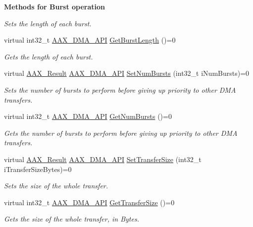 \begin{Indent}{\bf Methods for Burst operation}
\begin{DoxyCompactItemize}
\begin{DoxyCompactList}\small\item\em Sets the length of each burst. \end{DoxyCompactList}\item 
virtual int32\+\_\+t \hyperlink{a00243_acae60d01e5e4bd3282369d0d9d378f3f}{A\+A\+X\+\_\+\+D\+M\+A\+\_\+\+A\+P\+I} \hyperlink{a00095_ac4ded104803ed34131be6924d591f0e6}{Get\+Burst\+Length} ()=0
\begin{DoxyCompactList}\small\item\em Gets the length of each burst. \end{DoxyCompactList}\item 
virtual \hyperlink{a00149_a4d8f69a697df7f70c3a8e9b8ee130d2f}{A\+A\+X\+\_\+\+Result} \hyperlink{a00243_acae60d01e5e4bd3282369d0d9d378f3f}{A\+A\+X\+\_\+\+D\+M\+A\+\_\+\+A\+P\+I} \hyperlink{a00095_a174fc7382d7f587252f4a9e557830b91}{Set\+Num\+Bursts} (int32\+\_\+t i\+Num\+Bursts)=0
\begin{DoxyCompactList}\small\item\em Sets the number of bursts to perform before giving up priority to other D\+M\+A transfers. \end{DoxyCompactList}\item 
virtual int32\+\_\+t \hyperlink{a00243_acae60d01e5e4bd3282369d0d9d378f3f}{A\+A\+X\+\_\+\+D\+M\+A\+\_\+\+A\+P\+I} \hyperlink{a00095_ae8a335f5230a5f7face87f9efb7c8aaf}{Get\+Num\+Bursts} ()=0
\begin{DoxyCompactList}\small\item\em Gets the number of bursts to perform before giving up priority to other D\+M\+A transfers. \end{DoxyCompactList}\item 
virtual \hyperlink{a00149_a4d8f69a697df7f70c3a8e9b8ee130d2f}{A\+A\+X\+\_\+\+Result} \hyperlink{a00243_acae60d01e5e4bd3282369d0d9d378f3f}{A\+A\+X\+\_\+\+D\+M\+A\+\_\+\+A\+P\+I} \hyperlink{a00095_a4d38f5502dc2446ea997e675d3f59d61}{Set\+Transfer\+Size} (int32\+\_\+t i\+Transfer\+Size\+Bytes)=0
\begin{DoxyCompactList}\small\item\em Sets the size of the whole transfer. \end{DoxyCompactList}\item 
virtual int32\+\_\+t \hyperlink{a00243_acae60d01e5e4bd3282369d0d9d378f3f}{A\+A\+X\+\_\+\+D\+M\+A\+\_\+\+A\+P\+I} \hyperlink{a00095_a3cd20d341b8b592d259716768a03a88a}{Get\+Transfer\+Size} ()=0
\begin{DoxyCompactList}\small\item\em Gets the size of the whole transfer, in Bytes. \end{DoxyCompactList}\end{DoxyCompactItemize}
\end{Indent}
